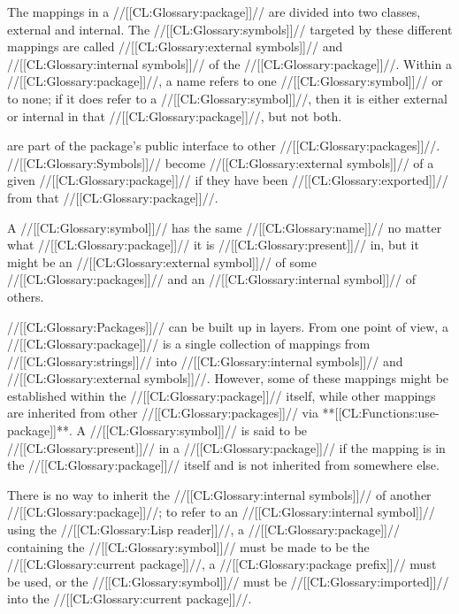 \endsubsubsection%




The mappings in a //[[CL:Glossary:package]]// are divided into two classes, external and internal.
The //[[CL:Glossary:symbols]]// targeted by these different mappings 
are called //[[CL:Glossary:external symbols]]// and //[[CL:Glossary:internal symbols]]// of the
//[[CL:Glossary:package]]//. Within a //[[CL:Glossary:package]]//, a name refers to one
//[[CL:Glossary:symbol]]// or to none; if it does refer
to a //[[CL:Glossary:symbol]]//, then it is either external or internal in that
//[[CL:Glossary:package]]//, but not both.

are part of the package's public interface to other //[[CL:Glossary:packages]]//.
//[[CL:Glossary:Symbols]]// become //[[CL:Glossary:external symbols]]// of a given
//[[CL:Glossary:package]]// if they have been //[[CL:Glossary:exported]]// from that //[[CL:Glossary:package]]//.


A //[[CL:Glossary:symbol]]// has the same //[[CL:Glossary:name]]// no matter what //[[CL:Glossary:package]]// 
it is //[[CL:Glossary:present]]// in, but it might be an //[[CL:Glossary:external symbol]]// of some //[[CL:Glossary:packages]]//
and an //[[CL:Glossary:internal symbol]]// of others. 

\endsubsubsubsection%



//[[CL:Glossary:Packages]]// can be built up in layers.  From one point of view,
a //[[CL:Glossary:package]]// is a single collection
of mappings from //[[CL:Glossary:strings]]// into //[[CL:Glossary:internal symbols]]// and 
//[[CL:Glossary:external symbols]]//.
However, some of these mappings might be established within the //[[CL:Glossary:package]]// 
itself, while other mappings are inherited from other //[[CL:Glossary:packages]]// 
via **[[CL:Functions:use-package]]**.
A //[[CL:Glossary:symbol]]// is said to be //[[CL:Glossary:present]]// in a //[[CL:Glossary:package]]// 
if the mapping is in the //[[CL:Glossary:package]]// itself and is
not inherited from somewhere else.


There is no way to inherit the //[[CL:Glossary:internal symbols]]// of another //[[CL:Glossary:package]]//;
to refer to an //[[CL:Glossary:internal symbol]]// using the //[[CL:Glossary:Lisp reader]]//, 
    a //[[CL:Glossary:package]]// containing the //[[CL:Glossary:symbol]]// 
     must be made to be the //[[CL:Glossary:current package]]//,
    a //[[CL:Glossary:package prefix]]// must be used,
 or the //[[CL:Glossary:symbol]]// must be //[[CL:Glossary:imported]]// into the //[[CL:Glossary:current package]]//.

